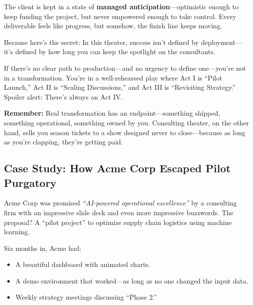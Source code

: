   \medskip
  
  The client is kept in a state of \textbf{managed anticipation}—optimistic enough to keep funding the project, but never empowered enough to take control. Every deliverable feels like progress, but somehow, the finish line keeps moving.
  
  Because here’s the secret: In this theater, success isn’t defined by deployment—it’s defined by how long you can keep the spotlight on the consultants.
  
  If there’s no clear path to production—and no urgency to define one—you’re not in a transformation.  You’re in a well-rehearsed play where Act I is ``Pilot Launch,'' Act II is ``Scaling Discussions,'' and Act III is ``Revisiting Strategy.'' Spoiler alert: There’s always an Act IV.
  
  \textbf{Remember:} Real transformation has an endpoint—something shipped, something operational, something owned by you.  Consulting theater, on the other hand, sells you season tickets to a show designed never to close—because as long as you're clapping, they’re getting paid.
  


\subsection{Case Study: How Acme Corp Escaped Pilot Purgatory}

Acme Corp was promised \textit{“AI-powered operational excellence”} by a consulting firm with an impressive slide deck and even more impressive buzzwords. The proposal? A ``pilot project'' to optimize supply chain logistics using machine learning.

Six months in, Acme had:

\begin{itemize}
  \item A beautiful dashboard with animated charts.
  \item A demo environment that worked—as long as no one changed the input data.
  \item Weekly strategy meetings discussing ``Phase 2.''
\end{itemize}


